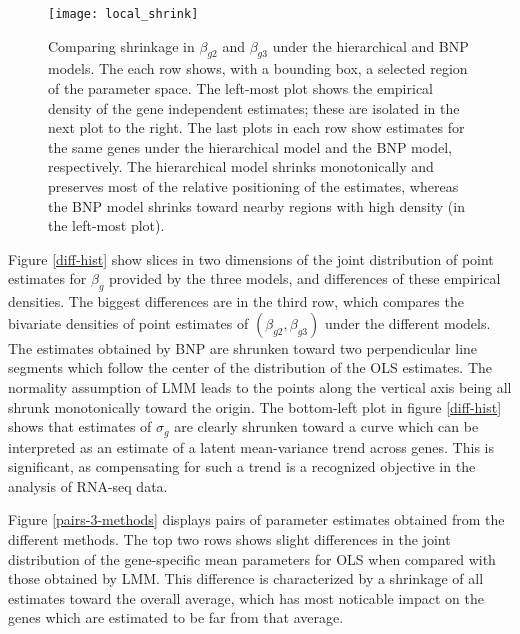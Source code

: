 {\begin{figure}
\centering
\texttt{[image: local\_shrink]}
\caption{\small Comparing shrinkage in $\beta_{g2}$ and $\beta_{g3}$ under the hierarchical and BNP models. The each row shows, with a bounding box, a selected region of the parameter space. The left-most plot shows the empirical density of the gene independent estimates; these are isolated in the next plot to the right. The last plots in each row show estimates for the same genes under the hierarchical model and the BNP model, respectively. The hierarchical model shrinks monotonically and preserves most of the relative positioning of the estimates, whereas the BNP model shrinks toward nearby regions with high density (in the left-most plot).}
\label{method-compare}
\end{figure}



Figure \ref{diff-hist} show slices in two dimensions of the joint distribution of point estimates for $\beta_g$ provided by the three models, and differences of these empirical densities. The biggest differences are in the third row, which compares the bivariate densities of point estimates of $(\beta_{g2},\beta_{g3})$ under the different models. The estimates obtained by BNP are shrunken toward two perpendicular line segments which follow the center of the distribution of the OLS estimates. The normality assumption of LMM leads to the points along the vertical axis being all shrunk monotonically toward the origin. The bottom-left plot in figure \ref{diff-hist} shows that estimates of $\sigma_g$ are clearly shrunken toward a curve which can be interpreted as an estimate of a latent mean-variance trend across genes. This is significant, as compensating for such a trend is a recognized objective in the analysis of RNA-seq data.



Figure \ref{pairs-3-methods} displays pairs of parameter estimates obtained from the different methods. The top two rows shows slight differences in the joint distribution of the gene-specific mean parameters for OLS when compared with those obtained by LMM. This difference is characterized by a shrinkage of all estimates toward the overall average, which has most noticable impact on the genes which are estimated to be far from that average.

}
